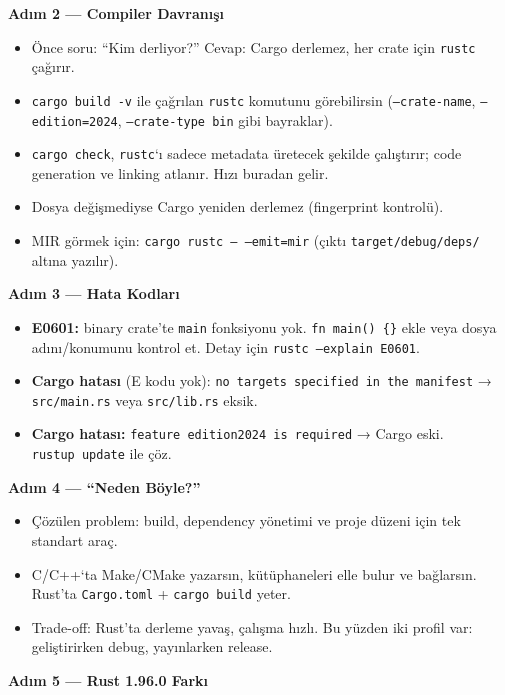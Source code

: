 \documentclass[12pt,a4paper]{article}
\begin{document}
\textbf{Adım 2 --- Compiler Davranışı}

\begin{itemize}
\tightlist
\item
  Önce soru: ``Kim derliyor?'' Cevap: Cargo derlemez, her crate için \texttt{rustc} çağırır.
\item
  \texttt{cargo\ build\ -v} ile çağrılan \texttt{rustc} komutunu görebilirsin (\texttt{--crate-name}, \texttt{--edition=2024}, \texttt{--crate-type\ bin} gibi bayraklar).
\item
  \texttt{cargo\ check}, \texttt{rustc}`ı sadece metadata üretecek şekilde çalıştırır; code generation ve linking atlanır. Hızı buradan gelir.
\item
  Dosya değişmediyse Cargo yeniden derlemez (fingerprint kontrolü).
\item
  MIR görmek için: \texttt{cargo\ rustc\ --\ --emit=mir} (çıktı \texttt{target/debug/deps/} altına yazılır).
\end{itemize}

\textbf{Adım 3 --- Hata Kodları}

\begin{itemize}
\tightlist
\item
  \textbf{E0601:} binary crate'te \texttt{main} fonksiyonu yok. \texttt{fn\ main()\ \{\}} ekle veya dosya adını/konumunu kontrol et. Detay için \texttt{rustc\ --explain\ E0601}.
\item
  \textbf{Cargo hatası} (E kodu yok): \texttt{no\ targets\ specified\ in\ the\ manifest} → \texttt{src/main.rs} veya \texttt{src/lib.rs} eksik.
\item
  \textbf{Cargo hatası:} \texttt{feature\ edition2024\ is\ required} → Cargo eski. \texttt{rustup\ update} ile çöz.
\end{itemize}

\textbf{Adım 4 --- ``Neden Böyle?''}

\begin{itemize}
\tightlist
\item
  Çözülen problem: build, dependency yönetimi ve proje düzeni için tek standart araç.
\item
  C/C++`ta Make/CMake yazarsın, kütüphaneleri elle bulur ve bağlarsın. Rust'ta \texttt{Cargo.toml} + \texttt{cargo\ build} yeter.
\item
  Trade-off: Rust'ta derleme yavaş, çalışma hızlı. Bu yüzden iki profil var: geliştirirken debug, yayınlarken release.
\end{itemize}

\textbf{Adım 5 --- Rust 1.96.0 Farkı}
\end{document}
